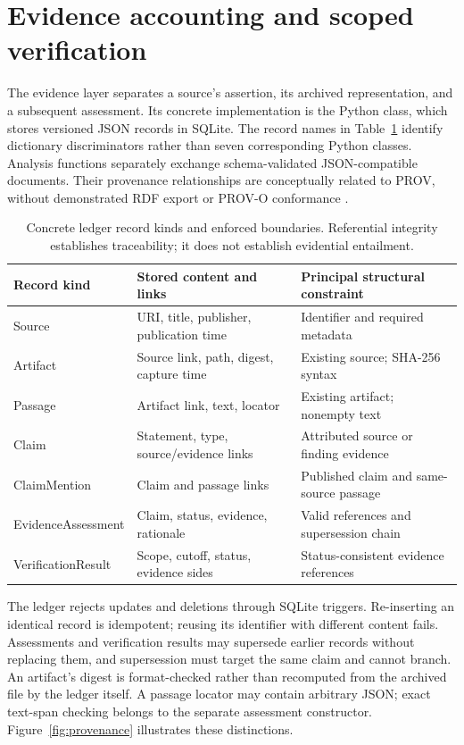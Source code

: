 \section{Evidence accounting and scoped verification}
\label{sec:evidence}

The evidence layer separates a source's assertion, its archived representation,
and a subsequent assessment. Its concrete implementation is the
 Python class, which stores versioned JSON records in
SQLite. The record names in Table~\ref{tab:evidence} identify dictionary
discriminators rather than seven corresponding Python classes. Analysis
functions separately exchange schema-validated JSON-compatible documents.
Their provenance relationships are conceptually related to PROV, without
demonstrated RDF export or PROV-O conformance
\citep{moreau2013provdm,lebo2013provo}.

\begin{table}[tb]
\centering
\small
\caption{Concrete ledger record kinds and enforced boundaries. Referential
integrity establishes traceability; it does not establish evidential entailment.}
\label{tab:evidence}
\begin{tabularx}{\linewidth}{@{}lXX@{}}
\toprule
Record kind & Stored content and links & Principal structural constraint \\
\midrule
Source & URI, title, publisher, publication time & Identifier and required metadata \\
Artifact & Source link, path, digest, capture time & Existing source; SHA-256 syntax \\
Passage & Artifact link, text, locator & Existing artifact; nonempty text \\
Claim & Statement, type, source/evidence links & Attributed source or finding evidence \\
ClaimMention & Claim and passage links & Published claim and same-source passage \\
EvidenceAssessment & Claim, status, evidence, rationale & Valid references and supersession chain \\
VerificationResult & Scope, cutoff, status, evidence sides & Status-consistent evidence references \\
\bottomrule
\end{tabularx}
\end{table}

The ledger rejects updates and deletions through SQLite triggers. Re-inserting
an identical record is idempotent; reusing its identifier with different content
fails. Assessments and verification results may supersede earlier records
without replacing them, and supersession must target the same claim and cannot
branch. An artifact's digest is format-checked rather than recomputed from the archived
file by the ledger itself. A passage locator may contain arbitrary JSON; exact
text-span checking belongs to the separate assessment constructor.
Figure~\ref{fig:provenance} illustrates these distinctions.


